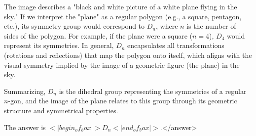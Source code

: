 The image describes a "black and white picture of a white plane flying in the sky." If we interpret the "plane" as a regular polygon (e.g., a square, pentagon, etc.), its symmetry group would correspond to \( D_n \), where \( n \) is the number of sides of the polygon. For example, if the plane were a square (\( n = 4 \)), \( D_4 \) would represent its symmetries. In general, \( D_n \) encapsulates all transformations (rotations and reflections) that map the polygon onto itself, which aligns with the visual symmetry implied by the image of a geometric figure (the plane) in the sky.  

Summarizing, \( D_n \) is the dihedral group representing the symmetries of a regular \( n \)-gon, and the image of the plane relates to this group through its geometric structure and symmetrical properties.  

The answer is \(<|begin_of_box|>D_n<|end_of_box|>\).</answer>